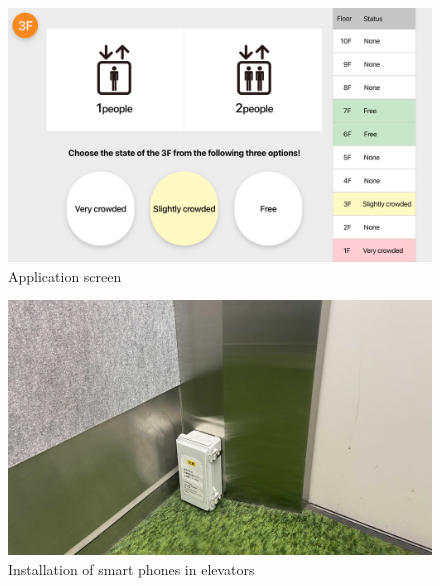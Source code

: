 \begin{figure}[t]
  \begin{center}
    \includegraphics[clip,  width=1.0\hsize]{img/application_sceen.png}
    \caption{Application screen}
    \label{fig:application_sceen}
  \end{center}
\end{figure}

\begin{figure}[t]
  \begin{center}
    \includegraphics[clip,  width=1.0\hsize]{img/kyudai_west2_elevator_inside.jpg}
    \caption{Installation of smart phones in elevators}
    \label{fig:kyudai_west2_elevator_inside}
  \end{center}
\end{figure}

